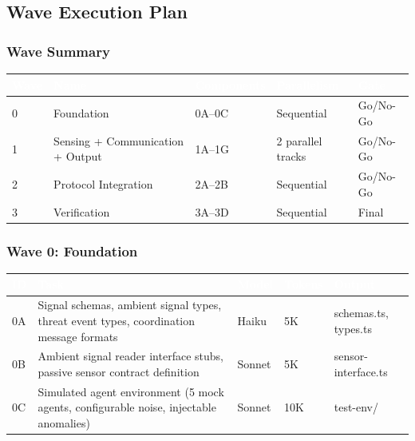 \documentclass[11pt,letterpaper]{article}
\newcommand{\tableheader}[1]{\textbf{\sffamily\textcolor{white}{#1}}}
\begin{document}
\subsection{Wave Execution Plan}

\subsubsection{Wave Summary}

\begin{center}
\begin{tabularx}{\textwidth}{C{1cm}L{3.5cm}C{2cm}C{2cm}C{1.5cm}}
\toprule
{}
\tableheader{Wave} & \tableheader{Name} & \tableheader{Components} & \tableheader{Parallelism} & \tableheader{Gate} \\
 & Foundation & 0A--0C & Sequential & Go/No-Go \\
1 & Sensing + Communication + Output & 1A--1G & 2 parallel tracks & Go/No-Go \\
2 & Protocol Integration & 2A--2B & Sequential & Go/No-Go \\
3 & Verification & 3A--3D & Sequential & Final \\
\bottomrule
\end{tabularx}
\end{center}

\subsubsection{Wave 0: Foundation}

\begin{center}
\begin{tabularx}{\textwidth}{C{0.8cm}L{3.5cm}L{1.5cm}C{1.2cm}X}
\toprule
{}
\tableheader{ID} & \tableheader{Task} & \tableheader{Model} & \tableheader{Tokens} & \tableheader{Output} \\
\midrule
0A & Signal schemas, ambient signal types, threat event types, coordination message formats & Haiku & 5K & schemas.ts, types.ts \\
0B & Ambient signal reader interface stubs, passive sensor contract definition & Sonnet & 5K & sensor-interface.ts \\
0C & Simulated agent environment (5 mock agents, configurable noise, injectable anomalies) & Sonnet & 10K & test-env/ \\
\bottomrule
\end{tabularx}
\end{center}
\end{document}
